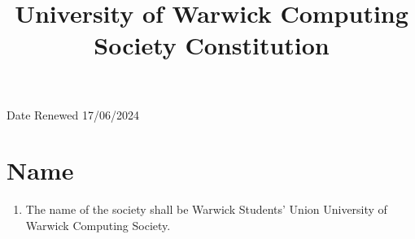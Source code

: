 \documentclass{article}
\title{\textbf{University of Warwick Computing Society Constitution} \vspace{-2cm}}
\author{}
\date{}
\begin{document}
\renewcommand{\labelenumi}{\arabic{section}.\arabic{enumi}}
\renewcommand{\labelenumii}{\arabic{section}.\arabic{enumi}.\arabic{enumii}}
\renewcommand{\labelenumiii}{\arabic{section}.\arabic{enumi}.\arabic{enumii}.\alph{enumiii}}
\maketitle

\begin{flushright}
    Date Renewed 17/06/2024
\end{flushright}

\section{Name}
\begin{enumerate}
    \item The name of the society shall be Warwick Students’ Union University of Warwick Computing Society.
\end{enumerate}
\end{document}
